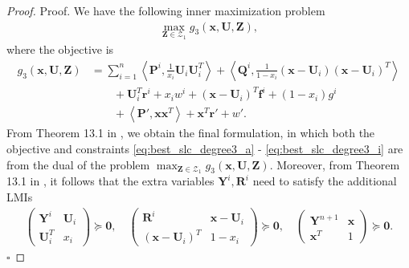 \documentclass[opre,nonblindrev]{informs3} %
\begin{document}
\begin{proof}{Proof. }
We have the following inner maximization problem  
\begin{align*}
    \max_{\boldsymbol{Z} \in \mathcal{Z}_1} g_3(\boldsymbol{x},\boldsymbol{U},\boldsymbol{Z}),
\end{align*}
where the objective is
\begin{align*}
  g_3(\boldsymbol{x},\boldsymbol{U},\boldsymbol{Z}) &=  \sum_{i=1}^n \left \langle \boldsymbol{P}^i, \frac{1}{x_i} \boldsymbol{U}_i \boldsymbol{U}_i^T \right \rangle + \left \langle \boldsymbol{Q}^i, \frac{1}{1-x_i} \left(\boldsymbol{x}-\boldsymbol{U}_i \right) \left( \boldsymbol{x} - \boldsymbol{U}_i\right)^T \right \rangle  \\ 
  & \quad \quad + \boldsymbol{U}_i^T \boldsymbol{r}^i + x_i w^i + \left(\boldsymbol{x}-\boldsymbol{U}_i \right)^T \boldsymbol{f}^i + (1-x_i)g^i \\ 
  &\quad \quad + \left \langle \boldsymbol{P}', \boldsymbol{x} \boldsymbol{x}^T \right \rangle + \boldsymbol{x}^T \boldsymbol{r}' + w' .
\end{align*} 
From Theorem 13.1 in \cite{bertsimas22}, we obtain the final formulation, in which both the objective and constraints \ref{eq:best_slc_degree3_a} - \ref{eq:best_slc_degree3_i} are from the dual of the problem $\max_{\boldsymbol{Z} \in \mathcal{Z}_1} g_3(\boldsymbol{x},\boldsymbol{U},\boldsymbol{Z})$. Moreover, from Theorem 13.1 in \cite{bertsimas22}, it follows that the extra variables $\boldsymbol{Y}^i, \boldsymbol{R}^i$ need to satisfy the additional LMIs 
\begin{align*}
    \begin{pmatrix}
                \boldsymbol{Y}^i & \boldsymbol{U}_i \\
                \boldsymbol{U}_i^T & x_i
           \end{pmatrix} \succeq \boldsymbol{0}, \quad  \begin{pmatrix}
                \boldsymbol{R}^i & \boldsymbol{x}-\boldsymbol{U}_i \\
                \left(\boldsymbol{x}-\boldsymbol{U}_i\right)^T & 1-x_i
           \end{pmatrix} \succeq \boldsymbol{0}, \quad \begin{pmatrix}
                \boldsymbol{Y}^{n+1} & \boldsymbol{x} \\
                \boldsymbol{x}^T & 1
           \end{pmatrix} \succeq \boldsymbol{0}.
\end{align*} \hfill $\square$
\end{proof}  
\end{document}
